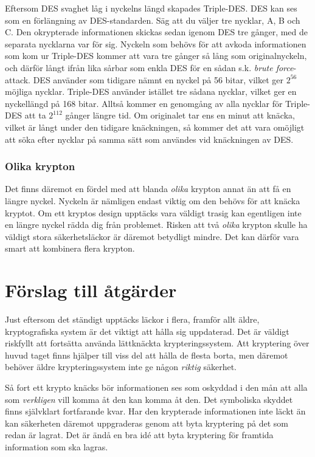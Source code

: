 \documentclass{article}
\begin{document}
		Eftersom DES svaghet låg i nyckelns längd skapades Triple-DES. DES kan ses som en förlängning av DES-standarden. Säg att du väljer tre nycklar, A, B och C. Den okrypterade informationen skickas sedan igenom DES tre gånger, med de separata nycklarna var för sig. Nyckeln som behövs för att avkoda informationen som kom ur Triple-DES kommer att vara tre gånger så lång som originalnyckeln, och därför långt ifrån lika sårbar  som enkla DES för en sådan s.k. \emph{brute force}-attack. DES använder som tidigare nämnt en nyckel på 56 bitar, vilket ger $2^{56}$ möjliga nycklar. Triple-DES använder istället tre sådana nycklar, vilket ger en nyckellängd på 168 bitar. Alltså kommer en genomgång av alla nycklar för Triple-DES att ta $2^{112}$ gånger längre tid. Om originalet tar ens en minut att knäcka, vilket är långt under den tidigare knäckningen, så kommer det att vara omöjligt att söka efter nycklar på samma sätt som användes vid knäckningen av DES.

		\subsubsection {Olika krypton}
		
		Det finns däremot en fördel med att blanda \emph{olika} krypton annat än att få en längre nyckel. Nyckeln är nämligen endast viktig om den behövs för att knäcka kryptot. Om ett kryptos design upptäcks vara väldigt trasig kan egentligen inte en längre nyckel rädda dig från problemet. Risken att två \emph{olika} krypton skulle ha väldigt stora säkerhetsläckor är däremot betydligt mindre. Det kan därför vara smart att kombinera flera krypton.

\section {Förslag till åtgärder}

Just eftersom det ständigt upptäcks läckor i flera, framför allt äldre, kryptografiska system är det viktigt att hålla sig uppdaterad. Det är väldigt riskfyllt att fortsätta använda lättknäckta krypteringssystem. Att kryptering över huvud taget finns hjälper till viss del att hålla de flesta borta, men däremot behöver äldre krypteringssystem inte ge någon \emph{riktig} säkerhet.

Så fort ett krypto knäcks bör informationen ses som oskyddad i den mån att alla som \emph{verkligen} vill komma åt den kan komma åt den. Det symboliska skyddet finns självklart fortfarande kvar. Har den krypterade informationen inte läckt än kan säkerheten däremot uppgraderas genom att byta kryptering på det som redan är lagrat. Det är ändå en bra idé att byta kryptering för framtida information som ska lagras.
\end{document}
